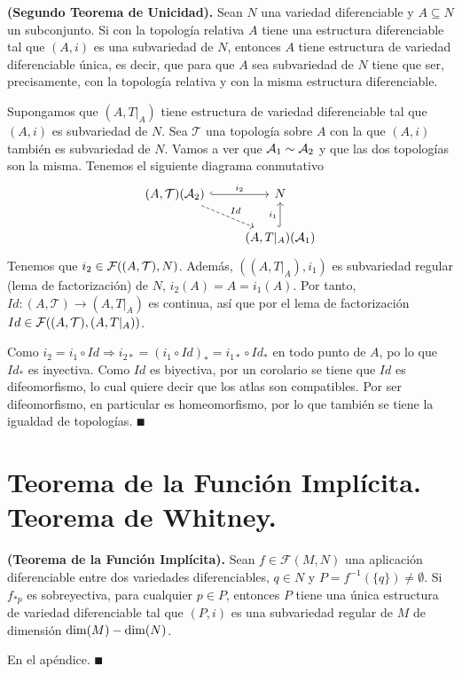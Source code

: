 \documentclass[Cursovd_portada.tex]{subfiles}
\begin{document}
\begin{teorema}
{\bf (Segundo Teorema de Unicidad).} Sean $N$ una variedad
diferenciable y $A\subseteq N$ un subconjunto. Si con la
topología relativa $A$ tiene una estructura diferenciable tal
que $(A,i)$ es una subvariedad de $N$, entonces $A$ tiene
estructura de variedad diferenciable única, es decir, que para
que $A$ sea subvariedad de $N$ tiene que ser, precisamente, con la
topología relativa y con la misma estructura diferenciable.
\end{teorema}
\begin{dem}
Supongamos que $(A,T|_A)$ tiene estructura de variedad diferenciable tal que $(A,i)$ es subvariedad de $N$. Sea $\mathcal{T}$ una topología sobre $A$ con la que $(A,i)$ también es subvariedad de $N$.  Vamos a ver que $\mathcal{A}_1\sim\mathcal{A}_2$ y que las dos topologías son la misma. Tenemos el siguiente diagrama conmutativo
\[
\begin{tikzcd}
(A,\mathcal{T}) (\calA_2)\arrow[r,hookrightarrow, "i_2"]\arrow[dr,dashrightarrow, "Id"] & N\\
& \arrow[u,hookrightarrow, "i_1"] (A,T|_A) (\calA_1)
\end{tikzcd}
\]
Tenemos que $i_2\in\mathcal{F}((A,\mathcal{T}), N)$. Además, $((A,T|_A),i_1)$ es subvariedad regular (lema de factorización) de $N$, $i_2(A)=A=i_1(A)$. Por tanto, $Id:(A,\mathcal{T})\to(A,T|_A)$ es continua, así que por el lema de factorización $Id\in\mathcal{F}((A,\mathcal{T}),(A,T|_A))$. 

Como $i_2=i_1\circ Id\Rightarrow i_{2*}=(i_1\circ Id)_*=i_{1*}\circ Id_*$ en todo punto de $A$, po lo que $Id_*$ es inyectiva. Como $Id$ es biyectiva, por un corolario se tiene que $Id$ es difeomorfismo, lo cual quiere decir que los atlas son compatibles. Por ser difeomorfismo, en particular es homeomorfismo, por lo que también se tiene la igualdad de topologías. $\QED$
\end{dem}
\section{Teorema de la Función Implícita. Teorema de Whitney.}
\begin{teorema}
{\bf (Teorema de la Función Implícita).} Sean
$f\in\mathcal{F}(M,N)$ una aplicación diferenciable entre dos
variedades diferenciables, $q\in N$ y
$P=f^{-1}(\{q\})\neq\emptyset$. Si $f_{*p}$ es sobreyectiva, para
cualquier $p\in P$, entonces $P$ tiene una única estructura de
variedad diferenciable tal que $(P,i)$ es una subvariedad regular
de $M$ de dimensión ${\rm dim}(M)-{\rm dim}(N)$.
\end{teorema}
\begin{dem}
En el apéndice. $\QED$
\end{dem}
\end{document}
